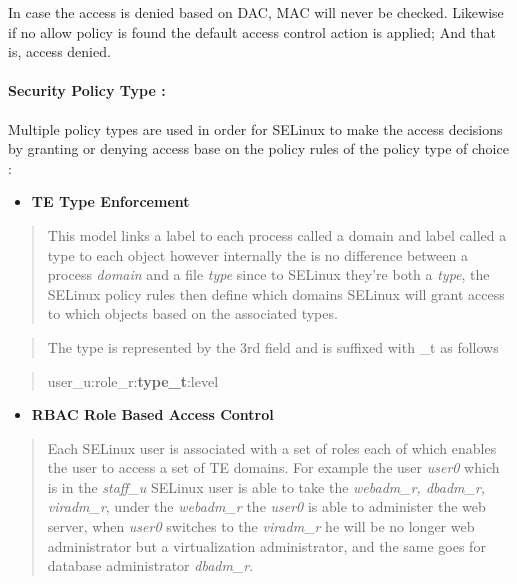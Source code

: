 \documentclass[
  14pt,
  english,
  a4paper,
]{scrreprt}
\providecommand{\tightlist}{%
  \setlength{\itemsep}{0pt}\setlength{\parskip}{0pt}}
\begin{document}
In case the access is denied based on DAC, MAC will never be checked.
Likewise if no allow policy is found the default access control action
is applied; And that is, access denied.

\hypertarget{security-policy-type}{%
\paragraph{Security Policy Type :}\label{security-policy-type}}

Multiple policy types are used in order for SELinux to make the access
decisions by granting or denying access base on the policy rules of the
policy type of choice :

\begin{itemize}
\tightlist
\item
  \textbf{TE Type Enforcement}
\end{itemize}

\begin{quote}
This model links a label to each process called a domain and label
called a type to each object however internally the is no difference
between a process \emph{domain} and a file \emph{type} since to SELinux
they're both a \emph{type}, the SELinux policy rules then define which
domains SELinux will grant access to which objects based on the
associated types.
\end{quote}

\begin{quote}
The type is represented by the 3rd field and is suffixed with \_t as
follows
\end{quote}

\begin{quote}
user\_u:role\_r:\textbf{type\_t}:level
\end{quote}

\begin{itemize}
\tightlist
\item
  \textbf{RBAC Role Based Access Control}
\end{itemize}

\begin{quote}
Each SELinux user is associated with a set of roles each of which
enables the user to access a set of TE domains. For example the user
\emph{user0} which is in the \emph{staff\_u} SELinux user is able to
take the \emph{webadm\_r, dbadm\_r, viradm\_r}, under the
\emph{webadm\_r} the \emph{user0} is able to administer the web server,
when \emph{user0} switches to the \emph{viradm\_r} he will be no longer
web administrator but a virtualization administrator, and the same goes
for database administrator \emph{dbadm\_r}.
\end{quote}
\end{document}
